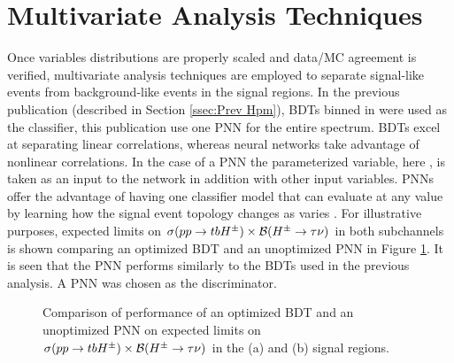 	\section{Multivariate Analysis Techniques}\label{sec:mva}
		Once variables distributions are properly scaled and data/\gls{MC} agreement is verified, multivariate analysis techniques are employed to separate signal-like events from background-like events in the signal regions. In the previous publication (described in Section \ref{ssec:Prev Hpm}), \glspl{BDT} binned in \mHpm were used as the classifier, this publication use one \gls{PNN} for the entire \mHpm spectrum. \glspl{BDT} excel at separating linear correlations, whereas neural networks take advantage of nonlinear correlations. In the case of a \gls{PNN} the parameterized variable, here \mHpm, is taken as an input to the network in addition with other input variables. \gls{PNN}s offer the advantage of having one classifier model that can evaluate at any \mHpm value by learning how the signal event topology changes as \mHpm varies \cite{PNN}. For illustrative purposes, expected limits on $\sigma(pp\to tbH^{\pm})\times \mathrm{\cal{B}}(H^{\pm} \to \tau \nu)$ in both subchannels is shown comparing an optimized \gls{BDT} and an unoptimized \gls{PNN} in Figure \ref{fig:bdt-vs-pnn-expected-limits}. It is seen that the \gls{PNN} performs similarly to the \glspl{BDT} used in the previous analysis. A \gls{PNN} was chosen as the discriminator. 

		\begin{figure}
		\caption{Comparison of performance of an optimized \gls{BDT} and an unoptimized \gls{PNN} on expected limits on $\sigma(pp\to tbH^{\pm})\times \mathrm{\cal{B}}(H^{\pm} \to \tau \nu)$ in the \taujets (a) and \taulep (b) signal regions. }
		\label{fig:bdt-vs-pnn-expected-limits}
		\end{figure}

